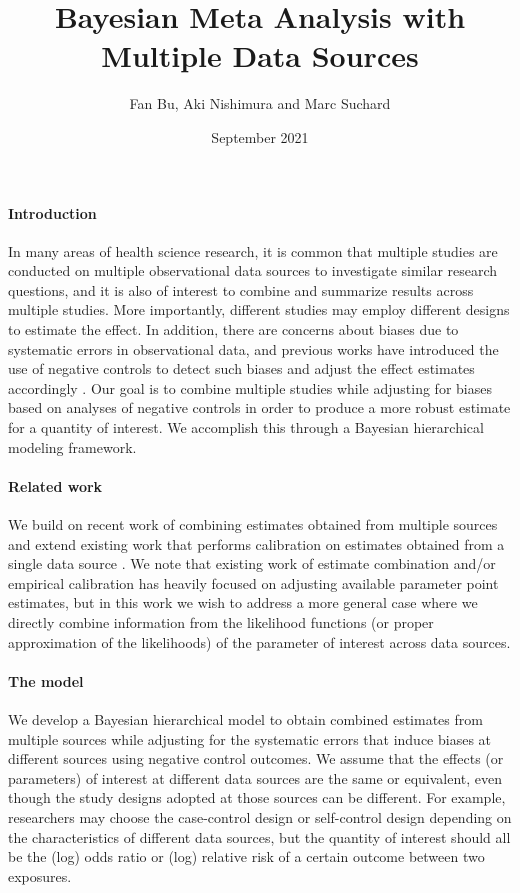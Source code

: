 \documentclass{article}
\title{Bayesian Meta Analysis with Multiple Data Sources}
\author{Fan Bu, Aki Nishimura and Marc Suchard}
\date{September 2021}
\begin{document}
\maketitle


\paragraph{Introduction} In many areas of health science research, it is common that multiple studies are conducted on multiple observational data sources to investigate similar research questions, 
and it is also of interest to combine and summarize results across multiple studies. 
More importantly, different studies may employ different designs to estimate the effect.  
In addition, there are concerns about biases due to systematic errors in observational data, 
and previous works have introduced the use of negative controls to detect such biases and adjust the effect estimates accordingly \citep{lipsitch2010negative,arnold2016brief,schuemie2018empirical}. 
Our goal is to combine multiple studies while adjusting for biases based on analyses of negative controls in order to produce a more robust estimate for a quantity of interest.
We accomplish this through a Bayesian hierarchical modeling framework. 


\paragraph{Related work} 
We build on recent work of combining estimates obtained from multiple sources \citep{yao2021bivariate} 
and extend existing work that performs calibration on estimates obtained from a single data source \citep{mulgrave2020bayesian}. 
We note that existing work of estimate combination and/or empirical calibration has heavily focused on adjusting available parameter point estimates, 
but in this work we wish to address a more general case where we directly combine information from the likelihood functions (or proper approximation of the likelihoods) of the parameter of interest across data sources. 

\paragraph{The model}
We develop a Bayesian hierarchical model to obtain combined estimates from multiple sources 
while adjusting for the systematic errors that induce biases at different sources using negative control outcomes.  
We assume that the effects (or parameters) of interest at different data sources are the same or equivalent, even though the study designs adopted at those sources can be different. 
For example, researchers may choose the case-control design or self-control design depending on the characteristics of different data sources, 
but the quantity of interest should all be the (log) odds ratio or (log) relative risk of a certain outcome between two exposures.
\end{document}
